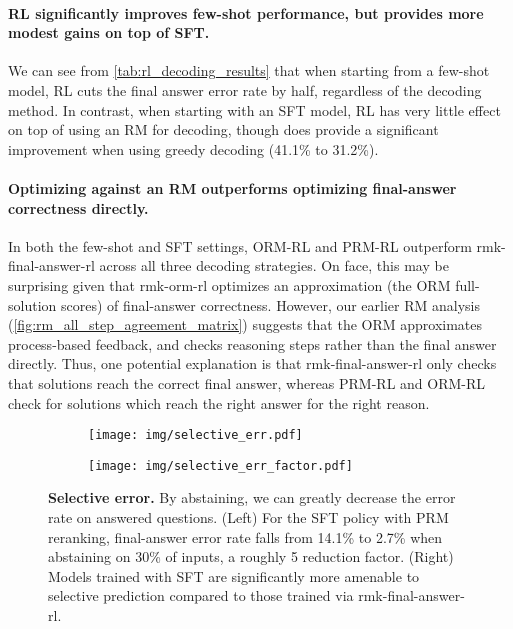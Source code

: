 \documentclass[11pt, a4paper, logo]{deepmind}
\newcommand{\ORM}{ORM}
\newcommand{\PRM}{PRM}
\newcommand{\Short}[1]{\csname rmk-#1\endcsname}
\newcommand{\finalanswerrl}{\Short{final-answer-rl}}
\newcommand{\ormrl}{ORM-RL}
\newcommand{\prmrl}{PRM-RL}
\begin{document}
\paragraph{RL significantly improves few-shot performance, but provides more modest gains on top of SFT.}
We can see from \cref{tab:rl_decoding_results} that when starting from a few-shot model, RL cuts the final answer error rate by half, regardless of the decoding method. In contrast, when starting with an SFT model, RL has very little effect on top of using an RM for decoding, though does provide a significant improvement when using greedy decoding (41.1\% to 31.2\%).


\paragraph{Optimizing against an RM outperforms optimizing final-answer correctness directly.}
In both the few-shot and SFT settings, \ormrl{} and \prmrl{} outperform \finalanswerrl{} across all three decoding strategies.
On face, this may be surprising given that \Short{orm-rl} optimizes an approximation (the \ORM{} full-solution scores) of final-answer correctness.
However, our earlier RM analysis (\cref{fig:rm_all_step_agreement_matrix}) suggests that the \ORM{} approximates process-based feedback, and checks reasoning steps rather than the final answer directly.
Thus, one potential explanation is that \finalanswerrl{} only checks that solutions reach the correct final answer, whereas \prmrl{} and \ormrl{} check for solutions which reach the right answer for the right reason.









\begin{figure}[t]
\centering
    \begin{subfigure}{0.45\textwidth}
        \centering
        \texttt{[image: img/selective\_err.pdf]}
    \end{subfigure}
    \begin{subfigure}{0.45\textwidth}
        \centering
        \texttt{[image: img/selective\_err\_factor.pdf]}
    \end{subfigure}

    \caption{\textbf{Selective error.}
    By abstaining, we can greatly decrease the error rate on answered questions.
    (Left) For the SFT policy with \PRM{} reranking, final-answer error rate falls from 14.1\% to 2.7\% when abstaining on 30\% of inputs, a roughly 5 reduction factor.
    (Right) Models trained with SFT are significantly more amenable to selective prediction compared to those trained via \finalanswerrl.
\label{fig:selective_acc}}
\end{figure}
\end{document}
